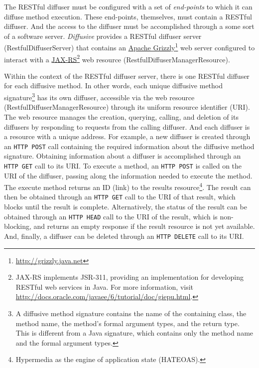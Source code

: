 \documentclass[11pt]{article}
\begin{document}
The RESTful diffuser must be configured with a set of \emph{end-points} to which it can diffuse method execution. These end-points, themselves, must contain a RESTful diffuser. And the access to the diffuser must be accomplished through a some sort of a software server. \emph{Diffusive} provides a RESTful diffuser server (\textsf{RestfulDiffuserServer}) that contains an \href{http://grizzly.java.net}{Apache Grizzly}\footnote{\url{http://grizzly.java.net}} web server configured to interact with a \href{http://docs.oracle.com/javaee/6/tutorial/doc/giepu.html}{JAX-RS}\footnote{JAX-RS implements JSR-311, providing an implementation for developing RESTful web services in Java. For more information, visit \url{http://docs.oracle.com/javaee/6/tutorial/doc/giepu.html}.} web resource (\textsf{RestfulDiffuserManagerResource}).

Within the context of the RESTful diffuser server, there is one RESTful diffuser for each diffusive method. In other words, each unique diffusive method signature\footnote{A diffusive method signature contains the name of the containing class, the method name, the method's formal argument types, and the return type. This is different from a Java signature, which contains only the method name and the formal argument types.} has its own diffuser, accessible via the web resource (\textsf{RestfulDiffuserManagerResource}) through its uniform resource identifier (URI). The web resource manages the creation, querying, calling, and deletion of its diffusers by responding to requests from the calling diffuser. And each diffuser is a resource with a unique address. For example, a new diffuser is created through an \texttt{HTTP POST} call containing the required information about the diffusive method signature. Obtaining information about a diffuser is accomplished through an \texttt{HTTP GET} call to its URI. To execute a method, an \texttt{HTTP POST} is called on the URI of the diffuser, passing along the information needed to execute the method. The execute method returns an ID (link) to the results resource\footnote{Hypermedia as the engine of application state (HATEOAS).}. The result can then be obtained through an \texttt{HTTP GET} call to the URI of that result, which blocks until the result is complete. Alternatively, the status of the result can be obtained through an \texttt{HTTP HEAD} call to the URI of the result, which is non-blocking, and returns an empty response if the result resource is not yet available. And, finally, a diffuser can be deleted through an \texttt{HTTP DELETE} call to its URI.
\end{document}
